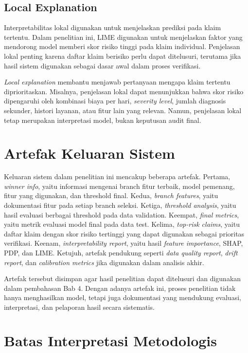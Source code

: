 \subsection{Local Explanation}\label{local-explanation}

Interpretabilitas lokal digunakan untuk menjelaskan prediksi pada klaim tertentu. Dalam penelitian ini, LIME digunakan untuk menjelaskan faktor yang mendorong model memberi skor risiko tinggi pada klaim individual. Penjelasan lokal penting karena daftar klaim berisiko perlu dapat ditelusuri, terutama jika hasil sistem digunakan sebagai dasar awal dalam proses verifikasi.

\emph{Local explanation} membantu menjawab pertanyaan mengapa klaim tertentu diprioritaskan. Misalnya, penjelasan lokal dapat menunjukkan bahwa skor risiko dipengaruhi oleh kombinasi biaya per hari, \emph{severity level}, jumlah diagnosis sekunder, histori layanan, atau fitur lain yang relevan. Namun, penjelasan lokal tetap merupakan interpretasi model, bukan keputusan audit final.

\section{Artefak Keluaran Sistem}\label{artefak-keluaran-sistem}

Keluaran sistem dalam penelitian ini mencakup beberapa artefak. Pertama, \emph{winner info}, yaitu informasi mengenai branch fitur terbaik, model pemenang, fitur yang digunakan, dan threshold final. Kedua, \emph{branch features}, yaitu dokumentasi fitur pada setiap branch seleksi. Ketiga, \emph{threshold analysis}, yaitu hasil evaluasi berbagai threshold pada data validation. Keempat, \emph{final metrics}, yaitu metrik evaluasi model final pada data test. Kelima, \emph{top-risk claims}, yaitu daftar klaim dengan skor risiko tertinggi yang dapat digunakan sebagai prioritas verifikasi. Keenam, \emph{interpretability report}, yaitu hasil \emph{feature importance}, SHAP, PDP, dan LIME. Ketujuh, artefak pendukung seperti \emph{data quality report}, \emph{drift report}, dan \emph{calibration metrics} jika digunakan dalam analisis akhir.

Artefak tersebut disimpan agar hasil penelitian dapat ditelusuri dan digunakan dalam pembahasan Bab 4. Dengan adanya artefak ini, proses penelitian tidak hanya menghasilkan model, tetapi juga dokumentasi yang mendukung evaluasi, interpretasi, dan pelaporan hasil secara sistematis.

\section{Batas Interpretasi Metodologis}\label{batas-interpretasi-metodologis}

